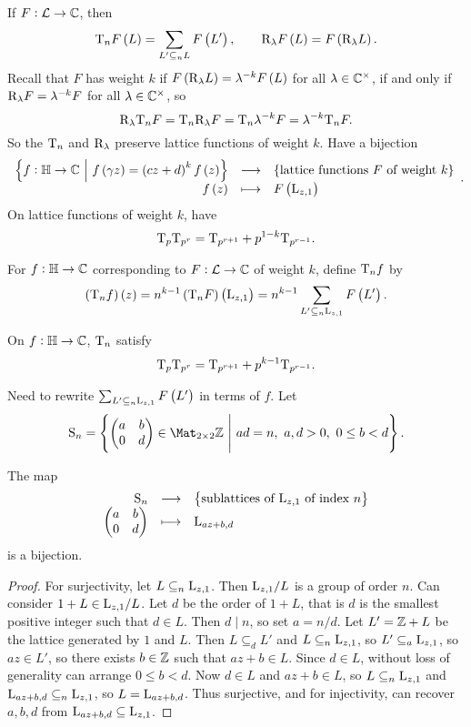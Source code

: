 
If $ F : \mathcal{L} \to \mathbb{C} $, then
$$ \T_nF\br{L} = \sum_{L' \subseteq_n L} F\br{L'}, \qquad \R_\lambda F\br{L} = F\br{\R_\lambda L}. $$
Recall that $ F $ has weight $ k $ if $ F\br{\R_\lambda L} = \lambda^{-k}F\br{L} $ for all $ \lambda \in \mathbb{C}^\times $, if and only if $ \mathrm{R}_\lambda F = \lambda^{-k}F $ for all $ \lambda \in \mathbb{C}^\times $, so
$$ \mathrm{R}_\lambda\mathrm{T}_nF = \mathrm{T}_n\mathrm{R}_\lambda F = \mathrm{T}_n\lambda^{-k}F = \lambda^{-k}\mathrm{T}_nF. $$
So the $ \mathrm{T}_n $ and $ \mathrm{R}_\lambda $ preserve lattice functions of weight $ k $. Have a bijection
$$ \function{\cbr{f : \HH \to \CC \st f\br{\gamma z} = \br{cz + d}^kf\br{z}}}{\cbr{\text{lattice functions} \ F \ \text{of weight} \ k}}{f\br{z}}{F\br{\L_{z, 1}}}. $$
On lattice functions of weight $ k $, have
$$ \mathrm{T}_p\mathrm{T}_{p^r} = \mathrm{T}_{p^{r + 1}} + p^{1 - k}\mathrm{T}_{p^{r - 1}}. $$

\begin{definition}
For $ f : \mathbb{H} \to \mathbb{C} $ corresponding to $ F : \mathcal{L} \to \mathbb{C} $ of weight $ k $, define $ \mathrm{T}_nf $ by
$$ \br{\T_nf}\br{z} = n^{k - 1}\br{\T_nF}\br{\L_{z, 1}} = n^{k - 1}\sum_{L' \subseteq_n \L_{z, 1}} F\br{L'}. $$
\end{definition}

On $ f : \mathbb{H} \to \mathbb{C} $, $ \mathrm{T}_n $ satisfy
$$ \mathrm{T}_p\mathrm{T}_{p^r} = \mathrm{T}_{p^{r + 1}} + p^{k - 1}\mathrm{T}_{p^{r - 1}}. $$

\pagebreak

Need to rewrite $ \sum_{L' \subseteq_n \L_{z, 1}} F\br{L'} $ in terms of $ f $. Let
$$ \S_n = \cbr{\twobytwo{a}{b}{0}{d} \in \Mat_{2 \times 2} \ZZ \st ad = n, \ a, d > 0, \ 0 \le b < d}. $$

\begin{lemma}
The map
$$ \function{\S_n}{\cbr{\text{sublattices of} \ \L_{z, 1} \ \text{of index} \ n}}{\twobytwo{a}{b}{0}{d}}{\L_{az + b, d}} $$
is a bijection.
\end{lemma}

\begin{proof}
For surjectivity, let $ L \subseteq_n \mathrm{L}_{z, 1} $. Then $ \mathrm{L}_{z, 1} / L $ is a group of order $ n $. Can consider $ 1 + L \in \mathrm{L}_{z, 1} / L $. Let $ d $ be the order of $ 1 + L $, that is $ d $ is the smallest positive integer such that $ d \in L $. Then $ d \mid n $, so set $ a = n / d $. Let $ L' = \mathbb{Z} + L $ be the lattice generated by $ 1 $ and $ L $. Then $ L \subseteq_d L' $ and $ L \subseteq_n \mathrm{L}_{z, 1} $, so $ L' \subseteq_a \mathrm{L}_{z, 1} $, so $ az \in L' $, so there exists $ b \in \mathbb{Z} $ such that $ az + b \in L $. Since $ d \in L $, without loss of generality can arrange $ 0 \le b < d $. Now $ d \in L $ and $ az + b \in L $, so $ L \subseteq_n \mathrm{L}_{z, 1} $ and $ \mathrm{L}_{az + b, d} \subseteq_n \mathrm{L}_{z, 1} $, so $ L = \mathrm{L}_{az + b, d} $. Thus surjective, and for injectivity, can recover $ a, b, d $ from $ \mathrm{L}_{az + b, d} \subseteq \mathrm{L}_{z, 1} $.
\end{proof}

